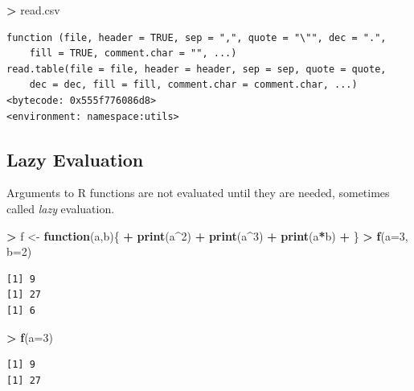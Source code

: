 \documentclass[]{krantz}
\makeatletter
\newenvironment{Shaded}{\begin{snugshade}}{\end{snugshade}}
\newcommand{\KeywordTok}[1]{\textcolor[rgb]{0.27,0.27,0.27}{\textbf{#1}}}
\newcommand{\DataTypeTok}[1]{\textcolor[rgb]{0.27,0.27,0.27}{#1}}
\newcommand{\DecValTok}[1]{\textcolor[rgb]{0.06,0.06,0.06}{#1}}
\newcommand{\StringTok}[1]{\textcolor[rgb]{0.5,0.5,0.5}{#1}}
\newcommand{\ControlFlowTok}[1]{\textcolor[rgb]{0.27,0.27,0.27}{\textbf{#1}}}
\newcommand{\OperatorTok}[1]{\textcolor[rgb]{0.43,0.43,0.43}{\textbf{#1}}}
\newcommand{\NormalTok}[1]{#1}
\newenvironment{kframe}{%
\medskip{}
\setlength{\fboxsep}{.8em}
 \def\at@end@of@kframe{}%
 \ifinner\ifhmode%
  \def\at@end@of@kframe{\end{minipage}}%
  \begin{minipage}{\columnwidth}%
 \fi\fi%
 \def\FrameCommand##1{\hskip\@totalleftmargin \hskip-\fboxsep
 \colorbox{shadecolor}{##1}\hskip-\fboxsep
     \hskip-\linewidth \hskip-\@totalleftmargin \hskip\columnwidth}%
 \MakeFramed {\advance\hsize-\width
   \@totalleftmargin\z@ \linewidth\hsize
   \@setminipage}}%
 {\par\unskip\endMakeFramed%
 \at@end@of@kframe}
\renewenvironment{Shaded}{\begin{kframe}}{\end{kframe}}
\makeatother
\begin{document}
\begin{Shaded}
\begin{Highlighting}[]
\OperatorTok{>}\StringTok{ }\NormalTok{read.csv}
\end{Highlighting}
\end{Shaded}

\begin{verbatim}
function (file, header = TRUE, sep = ",", quote = "\"", dec = ".", 
    fill = TRUE, comment.char = "", ...) 
read.table(file = file, header = header, sep = sep, quote = quote, 
    dec = dec, fill = fill, comment.char = comment.char, ...)
<bytecode: 0x555f776086d8>
<environment: namespace:utils>
\end{verbatim}

\subsection{Lazy Evaluation}\label{lazy-evaluation}

Arguments to R functions are not evaluated until they are needed,
sometimes called \emph{lazy} evaluation.

\begin{Shaded}
\begin{Highlighting}[]
\OperatorTok{>}\StringTok{ }\NormalTok{f <-}\StringTok{ }\ControlFlowTok{function}\NormalTok{(a,b)\{}
\OperatorTok{+}\StringTok{     }\KeywordTok{print}\NormalTok{(a}\OperatorTok{^}\DecValTok{2}\NormalTok{)}
\OperatorTok{+}\StringTok{     }\KeywordTok{print}\NormalTok{(a}\OperatorTok{^}\DecValTok{3}\NormalTok{)}
\OperatorTok{+}\StringTok{     }\KeywordTok{print}\NormalTok{(a}\OperatorTok{*}\NormalTok{b)}
\OperatorTok{+}\StringTok{ }\NormalTok{\}}
\OperatorTok{>}\StringTok{ }\KeywordTok{f}\NormalTok{(}\DataTypeTok{a=}\DecValTok{3}\NormalTok{, }\DataTypeTok{b=}\DecValTok{2}\NormalTok{)}
\end{Highlighting}
\end{Shaded}

\begin{verbatim}
[1] 9
[1] 27
[1] 6
\end{verbatim}

\begin{Shaded}
\begin{Highlighting}[]
\OperatorTok{>}\StringTok{ }\KeywordTok{f}\NormalTok{(}\DataTypeTok{a=}\DecValTok{3}\NormalTok{)}
\end{Highlighting}
\end{Shaded}

\begin{verbatim}
[1] 9
[1] 27
\end{verbatim}
\end{document}
